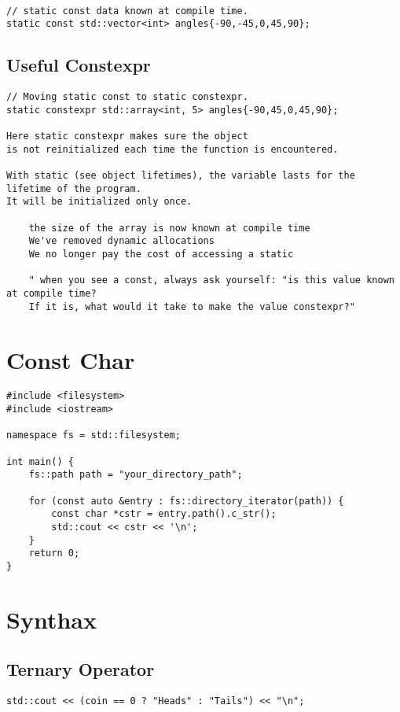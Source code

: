 \begin{verbatim}

// static const data known at compile time. 
static const std::vector<int> angles{-90,-45,0,45,90};
\end{verbatim}

\subsection{Useful Constexpr}

\begin{verbatim}
// Moving static const to static constexpr.
static constexpr std::array<int, 5> angles{-90,45,0,45,90};

Here static constexpr makes sure the object
is not reinitialized each time the function is encountered.

With static (see object lifetimes), the variable lasts for the lifetime of the program.
It will be initialized only once. 

    the size of the array is now known at compile time
    We've removed dynamic allocations
    We no longer pay the cost of accessing a static

    " when you see a const, always ask yourself: "is this value known at compile time? 
    If it is, what would it take to make the value constexpr?" 
\end{verbatim}

\section{Const Char}

\begin{verbatim}
#include <filesystem>
#include <iostream>

namespace fs = std::filesystem;

int main() {
    fs::path path = "your_directory_path";

    for (const auto &entry : fs::directory_iterator(path)) {
        const char *cstr = entry.path().c_str();
        std::cout << cstr << '\n';
    }
    return 0;
}
\end{verbatim}

\section{Synthax}
\subsection{Ternary Operator}
\begin{verbatim}
std::cout << (coin == 0 ? "Heads" : "Tails") << "\n";
\end{verbatim}

